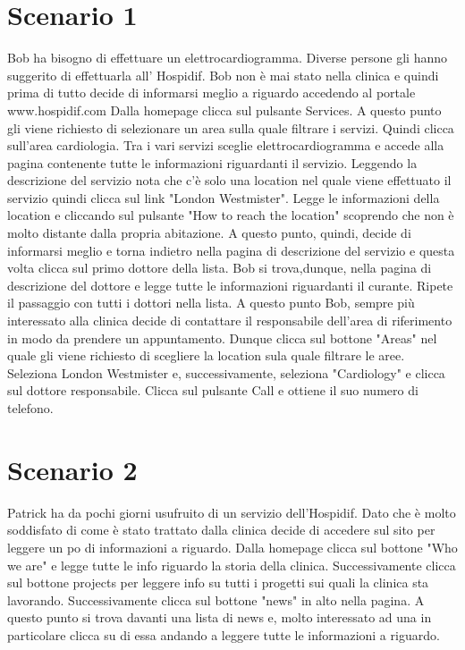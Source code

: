\documentclass{../Common/Structure/doc_pdf}
\begin{document}
\section{Scenario 1}
Bob ha bisogno di effettuare un elettrocardiogramma. Diverse persone gli hanno suggerito  di effettuarla all' Hospidif.
Bob non è mai stato nella clinica e quindi prima di tutto decide di informarsi meglio a riguardo accedendo al portale www.hospidif.com
Dalla homepage clicca sul pulsante Services. A questo punto gli viene richiesto di selezionare un area sulla quale filtrare i servizi.
Quindi clicca sull'area cardiologia. Tra i vari servizi sceglie elettrocardiogramma e accede alla pagina contenente tutte le informazioni
riguardanti il servizio. Leggendo la descrizione del servizio nota che c'è solo una location nel quale viene effettuato il
servizio quindi clicca sul link "London Westmister". Legge le informazioni della location e cliccando sul pulsante "How to reach the location"
scoprendo che non è molto distante dalla propria abitazione. A questo punto, quindi, decide di informarsi meglio e torna indietro nella pagina
di descrizione del servizio e questa volta clicca sul primo dottore della lista. Bob si trova,dunque, nella pagina di descrizione del dottore 
e legge tutte le informazioni riguardanti il curante. Ripete il passaggio con tutti i dottori nella lista. A questo punto Bob, sempre
più interessato alla clinica decide di contattare il responsabile dell'area di riferimento in modo da prendere un appuntamento.
Dunque clicca sul bottone "Areas" nel quale gli viene richiesto di scegliere la location sula quale filtrare le aree. Seleziona London Westmister e,
successivamente, seleziona "Cardiology" e clicca sul dottore responsabile. Clicca sul pulsante Call e ottiene il suo numero di telefono.

\newpage

\section{Scenario 2}
Patrick ha da pochi giorni usufruito di un servizio dell'Hospidif. Dato che è molto soddisfato di come è stato trattato dalla clinica decide di accedere
sul sito per leggere un po di informazioni a riguardo. Dalla homepage clicca sul bottone "Who we are" e legge tutte le info riguardo la storia della clinica.
Successivamente clicca sul bottone projects per leggere info su tutti i progetti sui quali la clinica sta lavorando. Successivamente clicca sul bottone "news"
in alto nella pagina. A questo punto si trova davanti una lista di news e, molto interessato ad una in particolare clicca su di essa andando a leggere tutte le
informazioni a riguardo.
\end{document}
